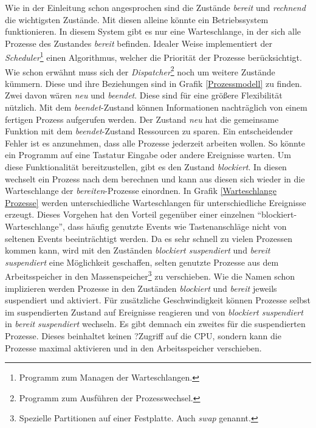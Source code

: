 \newpage
{}

Wie in der Einleitung schon angesprochen sind die Zustände \textit{bereit} und \textit{rechnend} die wichtigsten Zustände. Mit diesen alleine könnte ein Betriebssystem funktionieren. In diesem System gibt es nur eine Warteschlange, in der sich alle Prozesse des Zustandes \textit{bereit} befinden. Idealer Weise implementiert der \textit{Scheduler}\footnote{Programm zum Managen der Warteschlangen.} einen Algorithmus, welcher die Priorität der Prozesse berücksichtigt. Wie schon erwähnt muss sich der \textit{Dispatcher}\footnote{Programm zum Ausführen der Prozesswechsel.} noch um weitere Zustände kümmern. Diese und ihre Beziehungen sind in Grafik \ref{Prozessmodell} zu finden. Zwei davon wären \textit{neu} und \textit{beendet}. Diese sind für eine größere Flexibilität nützlich. Mit dem \textit{beendet}-Zustand können Informationen nachträglich von einem fertigen Prozess aufgerufen werden. Der Zustand \textit{neu} hat die gemeinsame Funktion mit dem \textit{beendet}-Zustand Ressourcen zu sparen.\newline
Ein entscheidender Fehler ist es anzunehmen, dass alle Prozesse jederzeit arbeiten wollen. So könnte ein Programm auf eine Tastatur Eingabe oder andere Ereignisse warten. Um diese Funktionalität bereitzustellen, gibt es den Zustand \textit{blockiert}. In diesen wechselt ein Prozess nach dem berechnen und kann aus diesen sich wieder in die Warteschlange der \textit{bereiten}-Prozesse einordnen. In Grafik \ref{Warteschlange Prozesse} werden unterschiedliche Warteschlangen für unterschiedliche Ereignisse erzeugt. Dieses Vorgehen hat den Vorteil gegenüber einer einzelnen ``blockiert-Warteschlange'', dass häufig genutzte Events wie Tastenanschläge nicht von seltenen Events beeinträchtigt werden.\newline
Da es sehr schnell zu vielen Prozessen kommen kann, wird mit den Zuständen \textit{blockiert suspendiert} und \textit{bereit suspendiert} eine Möglichkeit geschaffen, selten genutzte Prozesse aus dem Arbeitsspeicher in den Massenspeicher\footnote{Spezielle Partitionen auf einer Festplatte. Auch \textit{swap} genannt.} zu verschieben. Wie die Namen schon implizieren werden Prozesse in den Zuständen \textit{blockiert} und \textit{bereit} jeweils suspendiert und aktiviert. Für zusätzliche Geschwindigkeit können Prozesse selbst im suspendierten Zustand auf Ereignisse reagieren und von \textit{blockiert suspendiert} in \textit{bereit suspendiert} wechseln. Es gibt demnach ein zweites  für die suspendierten Prozesse. Dieses beinhaltet keinen ?Zugriff auf die CPU, sondern kann die Prozesse maximal aktivieren und in den Arbeitsspeicher verschieben. \cite{BetriebssystemeKompakt}

